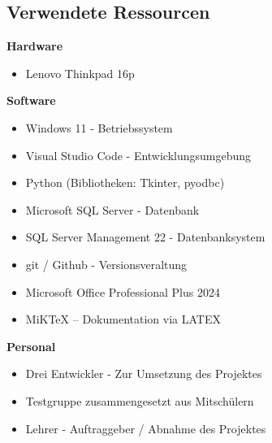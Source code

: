 \subsection{Verwendete Ressourcen}
\label{app:VerwendeteRessourcen}
\textbf{Hardware}
\begin{itemize}
    \item Lenovo Thinkpad 16p
\end{itemize}
\textbf{Software}
\begin{itemize}
    \item Windows 11 - Betriebssystem
    \item Visual Studio Code - Entwicklungsumgebung 
    \item Python (Bibliotheken: Tkinter, pyodbc) 
    \item Microsoft SQL Server - Datenbank
    \item SQL Server Management 22 - Datenbanksystem
    \item git / Github - Versionsveraltung
    \item Microsoft Office Professional Plus 2024
    \item MiKTeX – Dokumentation via LATEX
\end{itemize}
\textbf{Personal}
\begin{itemize}
    \item Drei Entwickler - Zur Umsetzung des Projektes
    \item Testgruppe zusammengesetzt aus Mitschülern
    \item Lehrer - Auftraggeber / Abnahme des Projektes
\end{itemize}